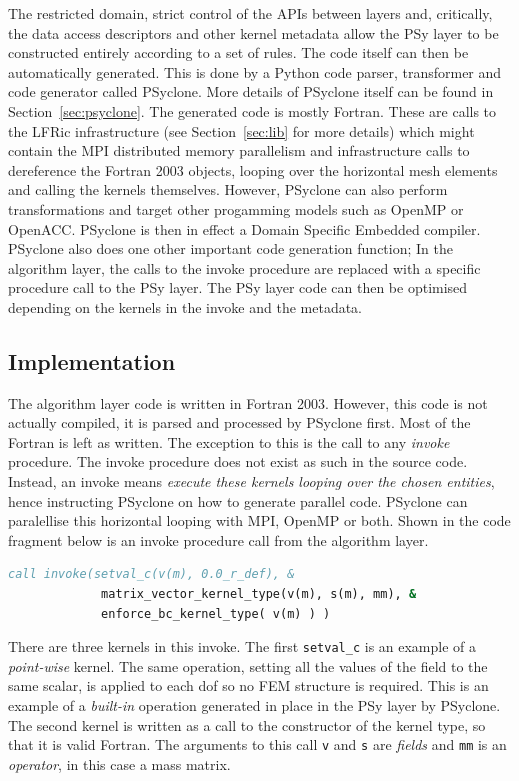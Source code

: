\documentclass[review,times]{elsarticle}
\begin{document}
The restricted domain, strict control of the APIs between layers and,
critically, the data access descriptors and other kernel metadata
allow the PSy layer to be constructed entirely according to a set of
rules. The code itself can then be automatically generated. This is
done by a Python code parser, transformer and code generator called
PSyclone. More details of PSyclone itself can be found in
Section~\ref{sec:psyclone}. The generated code is mostly Fortran.
These are calls to the LFRic infrastructure (see Section~\ref{sec:lib} 
for more details) which might contain the
MPI distributed memory parallelism and infrastructure calls
to dereference the Fortran 2003 objects, looping over
the horizontal mesh elements and calling the kernels
themselves. However, PSyclone can also perform transformations and
target other progamming models such as OpenMP or OpenACC. PSyclone is
then in effect a Domain Specific Embedded compiler. PSyclone also does
one other important code generation function; In the algorithm layer,
the calls to the invoke procedure are replaced with a specific
procedure call to the PSy layer. The PSy layer code can then be
optimised depending on the kernels in the invoke and the metadata.

\subsection{\label{sec:sub:implement}Implementation}
The algorithm layer code is written in Fortran 2003. However, this
code is not actually compiled, it is parsed and processed by PSyclone
first. Most of the Fortran is left as written. The exception to this
is the call to any {\em invoke} procedure. The invoke procedure does not 
exist as such in the source code. Instead, an invoke means {\em execute these
kernels looping over the chosen entities}, hence instructing PSyclone on how to 
generate parallel code. PSyclone can paralellise this horizontal looping with MPI,
OpenMP or both. Shown in the code fragment below is an invoke
procedure call from the algorithm layer.

\begin{lstlisting}[language=Fortran,caption={Code fragment showing an
invoke procedure from the Algorithm layer},label={lst:invoke}]
 call invoke(setval_c(v(m), 0.0_r_def), &
             matrix_vector_kernel_type(v(m), s(m), mm), &
             enforce_bc_kernel_type( v(m) ) )
\end{lstlisting}

There are three kernels in this invoke. The first \verb+setval_c+ is
an example of a {\em point-wise} kernel. The same operation, setting all
the values of the field to the same scalar, is applied to each dof so no 
FEM structure is required. This is an example of a {\em built-in} operation 
generated in place in the PSy layer by PSyclone. The second
kernel is written as a call to the constructor of the kernel type, so that it is
valid Fortran. The arguments to this call \verb+v+ and \verb+s+ are
{\em fields} and \verb+mm+ is an {\em operator}, in this case a mass
matrix.
\end{document}
